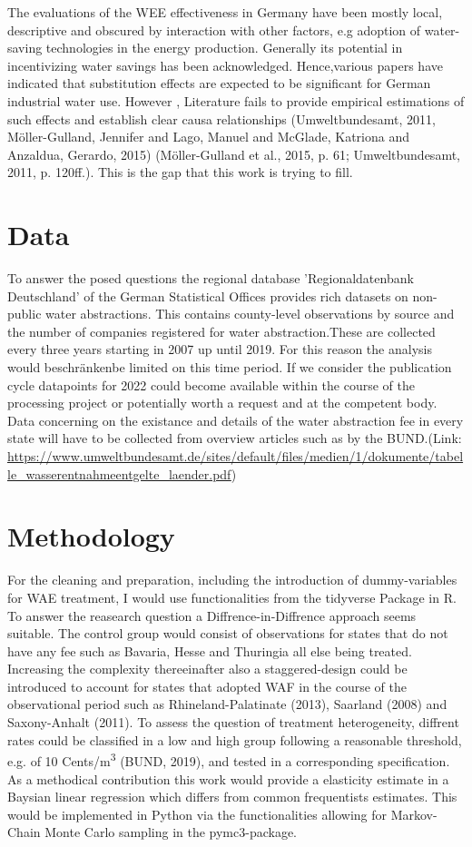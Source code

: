 \documentclass[11pt]{article}
\begin{document}
The evaluations of the WEE effectiveness in Germany have been mostly local, descriptive and obscured by interaction with other factors, e.g adoption of water-saving technologies in the energy production. Generally its potential in incentivizing water savings has been acknowledged. Hence,various papers have indicated that substitution effects are expected to be significant for German industrial water use. However , Literature fails to provide empirical estimations of such effects and establish clear causa relationships (Umweltbundesamt, 2011,  Möller-Gulland, Jennifer and Lago, Manuel and {McGlade}, Katriona and Anzaldua, Gerardo, 2015) (Möller-Gulland et al., 2015, p. 61; Umweltbundesamt, 2011, p. 120ff.). This is the gap that this work is trying to fill.

\section{Data}
\label{sec:org982eb20}
To answer the posed questions the regional database  'Regionaldatenbank Deutschland' of the  German Statistical Offices  provides rich datasets on non-public water abstractions. This contains county-level observations by source and the number of companies registered for water abstraction.These are collected every three years starting in 2007 up until 2019. For this reason the analysis would beschränkenbe limited on this time period.
If we consider the publication cycle datapoints for 2022 could become available within the course of the processing project or potentially worth a request and at the competent body.
Data concerning on the existance and details of the water abstraction fee in every state will have to be collected from overview articles such as by the BUND.(Link: \url{https://www.umweltbundesamt.de/sites/default/files/medien/1/dokumente/tabelle\_wasserentnahmeentgelte\_laender.pdf})

\section{Methodology}
\label{sec:org3146656}
For the cleaning and preparation, including the introduction of dummy-variables for WAE treatment, I would use functionalities from the tidyverse Package in R.
To answer the reasearch question a Diffrence-in-Diffrence approach seems suitable. The control group would consist of observations for states that do not have any fee such as Bavaria, Hesse and Thuringia all else being treated.
Increasing the complexity thereeinafter also a staggered-design could be introduced to account for states that adopted WAF in the course of the observational period such as Rhineland-Palatinate (2013), Saarland (2008) and Saxony-Anhalt (2011).
To assess the question of treatment heterogeneity, diffrent rates could be classified in a low and high group following a reasonable threshold, e.g. of 10 Cents/m\textsuperscript{3} ({BUND}, 2019), and tested in a corresponding specification.
As a methodical contribution this work would provide a elasticity estimate in a Baysian linear regression which differs from common frequentists estimates.
This would be implemented in Python via the functionalities allowing for Markov-Chain Monte Carlo sampling in the pymc3-package.  
\end{document}
